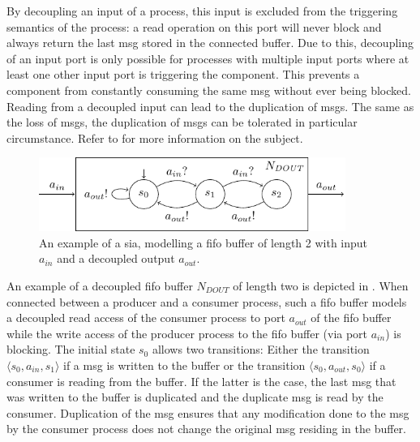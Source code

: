 By decoupling an input of a process, this input is excluded from the triggering semantics of the process: a read operation on this port will never block and always return the last \gls*{msg} stored in the connected buffer.
Due to this, decoupling of an input port is only possible for processes with multiple input ports where at least one other input port is triggering the component.
This prevents a component from constantly consuming the same \gls*{msg} without ever being blocked.
Reading from a decoupled input can lead to the duplication of \glspl*{msg}.
The same as the loss of \glspl*{msg}, the duplication of \glspl*{msg} can be tolerated in particular circumstance.
Refer to \Sect{\ref{sect_tcm_msg}} for more information on the subject.
\begin{figure}[bht]
    \TopFigSpace
    \centering
    \includegraphics[width=10cm]{fig/sia_cci_out.pdf}
    \CaptionFigSpace
    \caption{An example of a \gls{sia}, modelling a \gls{fifo} buffer of length 2 with input $a_{in}$ and a decoupled output $a_{out}$.}
    \label{fig_sia_cci_out}
    \BotFigSpace
\end{figure}
An example of a decoupled \gls{fifo} buffer $N_{\mathit{DOUT}}$ of length two is depicted in \Fig{\ref{fig_sia_cci_out}}.
When connected between a producer and a consumer process, such a \gls{fifo} buffer models a decoupled read access of the consumer process to port $a_{out}$ of the \gls{fifo} buffer while the write access of the producer process to the \gls{fifo} buffer (via port $a_{in}$) is blocking.
The initial state $s_0$ allows two transitions:
Either the transition $\langle s_0, a_{in}, s_1 \rangle$ if a \gls*{msg} is written to the buffer or the transition $\langle s_0, a_{out}, s_0 \rangle$ if a consumer is reading from the buffer.
If the latter is the case, the last \gls*{msg} that was written to the buffer is duplicated and the duplicate \gls*{msg} is read by the consumer.
Duplication of the \gls*{msg} ensures that any modification done to the \gls*{msg} by the consumer process does not change the original \gls*{msg} residing in the buffer.

